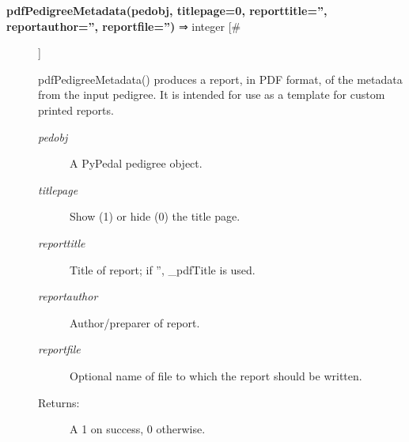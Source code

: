 \documentclass[10pt]{article}
\begin{document}
\begin{description}
\item[\textbf{pdfPedigreeMetadata(pedobj, titlepage=0, reporttitle='', reportauthor='', reportfile='')}
 ⇒ integer [\#]]

 pdfPedigreeMetadata() produces a report, in PDF format, of the metadata from the input pedigree. It is intended for use as a template for custom printed reports.
\begin{description}
\item[\emph{pedobj}
] A PyPedal pedigree object.
\item[\emph{titlepage}
] Show (1) or hide (0) the title page.
\item[\emph{reporttitle}
] Title of report; if '', \_pdfTitle is used.
\item[\emph{reportauthor}
] Author/preparer of report.
\item[\emph{reportfile}
] Optional name of file to which the report should be written.
\item[Returns:] A 1 on success, 0 otherwise.

\end{description}
\\ 


\end{description}
\end{document}
